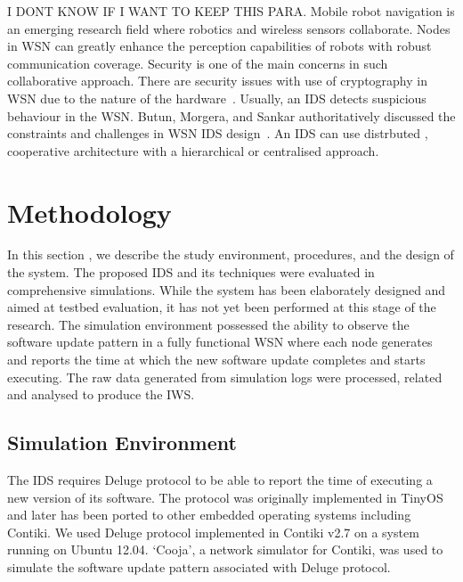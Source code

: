 \documentclass[conference,manuscript]{IEEEtran}
\begin{document}
I DONT KNOW IF I WANT TO KEEP THIS PARA.
Mobile robot navigation is an emerging research field where robotics and wireless sensors collaborate.
Nodes in WSN can greatly enhance the perception capabilities of robots with robust communication coverage.
Security is one of the main concerns in such collaborative approach.
There are security issues with use of cryptography in WSN due to the nature of the hardware~\cite{1710}.
Usually, an IDS detects suspicious behaviour in the WSN.
Butun, Morgera, and Sankar authoritatively discussed the constraints and challenges in WSN IDS design~\cite{6517052}.
An IDS can use distrbuted , cooperative architecture with a hierarchical or centralised approach.


\section{Methodology}
\label{sec:meth}
In this section , we describe the study environment, procedures, and the design of the system.
The proposed IDS and its techniques were evaluated in comprehensive simulations.
While the system has been elaborately designed and aimed at testbed evaluation, it has not yet been performed at this stage of the research. 
The simulation environment possessed the ability to observe the software update pattern in a fully functional WSN where each node generates and reports the time at which the new software update completes and starts executing.
The raw data generated from simulation logs were processed, related and  analysed to produce the IWS.

\subsection*{Simulation Environment}
\label{subsec:sim_env}
The IDS requires Deluge protocol to be able to report the time of executing  a new version of its software.
The protocol was originally implemented in TinyOS and later has been ported to other embedded operating systems including Contiki. 
We used Deluge protocol implemented in Contiki v2.7 on a system running on Ubuntu 12.04.
`Cooja', a network simulator for Contiki, was used to simulate the software update pattern associated with Deluge protocol. 
\end{document}
